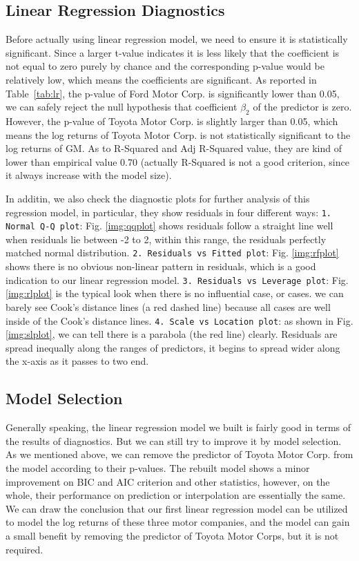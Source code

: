 \subsection{Linear Regression Diagnostics}

Before actually using linear regression model, we need to ensure it is statistically significant. Since a larger t-value indicates it is less likely that the coefficient is not equal to zero purely by chance and the corresponding p-value would be relatively low, which means the coefficients are significant. As reported in Table~\ref{tab:lr}, the p-value of Ford Motor Corp. is significantly lower than 0.05, we can safely reject the null hypothesis that coefficient $\beta_2$ of the predictor is zero. However, the p-value of Toyota Motor Corp. is slightly larger than 0.05, which means the log returns of Toyota Motor Corp. is not statistically significant to the log returns of GM. As to R-Squared and Adj R-Squared value, they are kind of lower than empirical value 0.70 (actually R-Squared is not a good criterion, since it always increase with the model size).

In additin, we also check the diagnostic plots for further analysis of this regression model, in particular, they show residuals in four different ways: \texttt{1. Normal Q-Q plot}: Fig. \ref{img:qqplot} shows residuals follow a straight line well when residuals lie between -2 to 2, within this range, the residuals perfectly matched normal distribution. \texttt{2. Residuals vs Fitted plot}: 
Fig. \ref{img:rfplot} shows there is no obvious non-linear pattern in residuals, which is a good indication to our linear regression model. \texttt{3. Residuals vs Leverage plot}: Fig. \ref{img:rlplot} is the typical look when there is no influential case, or cases. we can barely see Cook's distance lines (a red dashed line) because all cases are well inside of the Cook's distance lines. \texttt{4. Scale vs Location plot}: as shown in Fig. \ref{img:slplot}, we can tell there is a parabola (the red line) clearly. Residuals are spread inequally along the ranges of predictors, it begins to spread wider along the x-axis as it passes to two end. 

\subsection{Model Selection}

Generally speaking, the linear regression model we built is fairly good in terms of the results of diagnostics. But we can still try to improve it by model selection. As we mentioned above, we can remove the predictor of Toyota Motor Corp. from the model according to their p-values. The rebuilt model shows a minor improvement on BIC and AIC criterion and other statistics, however, on the whole, their performance on prediction or interpolation are essentially the same. We can draw the conclusion that our first linear regression model can be utilized to model the log returns of these three motor companies, and the model can gain a small benefit by removing the predictor of Toyota Motor Corps, but it is not required. 

